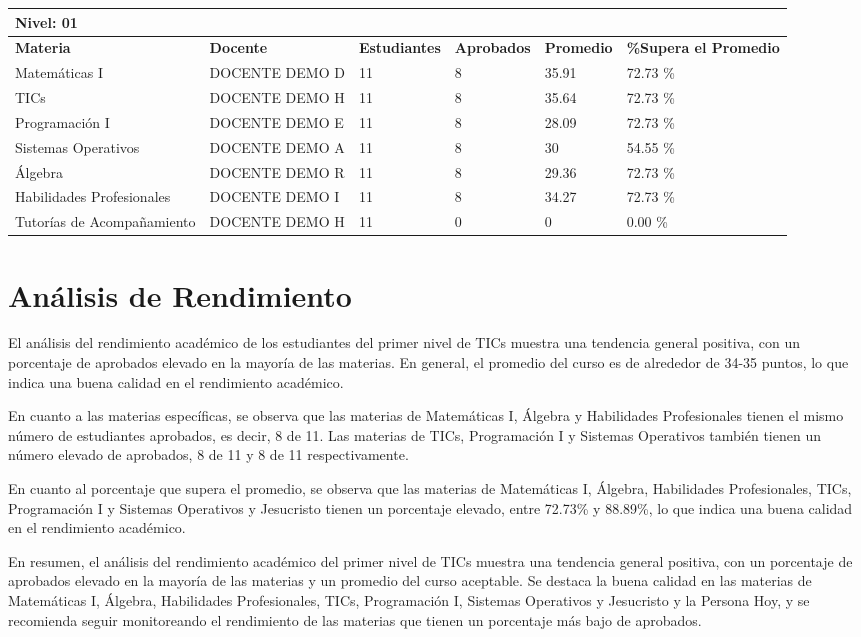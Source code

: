 \small
\begin{tabularx}{\textwidth}{|p{2.5cm}|p{2.5cm}|X|X|X|X|}
\hline
\multicolumn{6}{|X|}{\textbf{Nivel: 01 }}\\\hline\textbf{Materia} & \textbf{Docente} & \textbf{Estudiantes} & \textbf{Aprobados} & \textbf{Promedio} & \textbf{\%Supera el Promedio} \\ \hline
Matemáticas I & DOCENTE DEMO D & 11 & 8 & 35.91 & 72.73 \%\\ \hline
TICs & DOCENTE DEMO H & 11 & 8 & 35.64 & 72.73 \%\\ \hline
Programación I & DOCENTE DEMO E & 11 & 8 & 28.09 & 72.73 \%\\ \hline
Sistemas Operativos & DOCENTE DEMO A & 11 & 8 & 30 & 54.55 \%\\ \hline
Álgebra & DOCENTE DEMO R & 11 & 8 & 29.36 & 72.73 \%\\ \hline
Habilidades Profesionales & DOCENTE DEMO I & 11 & 8 & 34.27 & 72.73 \%\\ \hline
Tutorías de Acompañamiento & DOCENTE DEMO H & 11 & 0 & 0 & 0.00 \%\\ \hline
\end{tabularx}

\vspace{1cm}
\section{Análisis de Rendimiento}
El análisis del rendimiento académico de los estudiantes del primer nivel de TICs muestra una tendencia general positiva, con un porcentaje de aprobados elevado en la mayoría de las materias. En general, el promedio del curso es de alrededor de 34-35 puntos, lo que indica una buena calidad en el rendimiento académico.

En cuanto a las materias específicas, se observa que las materias de Matemáticas I, Álgebra y Habilidades Profesionales tienen el mismo número de estudiantes aprobados, es decir, 8 de 11. Las materias de TICs, Programación I y Sistemas Operativos también tienen un número elevado de aprobados, 8 de 11 y 8 de 11 respectivamente.

En cuanto al porcentaje que supera el promedio, se observa que las materias de Matemáticas I, Álgebra, Habilidades Profesionales, TICs, Programación I y Sistemas Operativos y Jesucristo tienen un porcentaje elevado, entre 72.73\% y 88.89\%, lo que indica una buena calidad en el rendimiento académico.

En resumen, el análisis del rendimiento académico del primer nivel de TICs muestra una tendencia general positiva, con un porcentaje de aprobados elevado en la mayoría de las materias y un promedio del curso aceptable. Se destaca la buena calidad en las materias de Matemáticas I, Álgebra, Habilidades Profesionales, TICs, Programación I, Sistemas Operativos y Jesucristo y la Persona Hoy, y se recomienda seguir monitoreando el rendimiento de las materias que tienen un porcentaje más bajo de aprobados.\\
\vspace{1cm}

